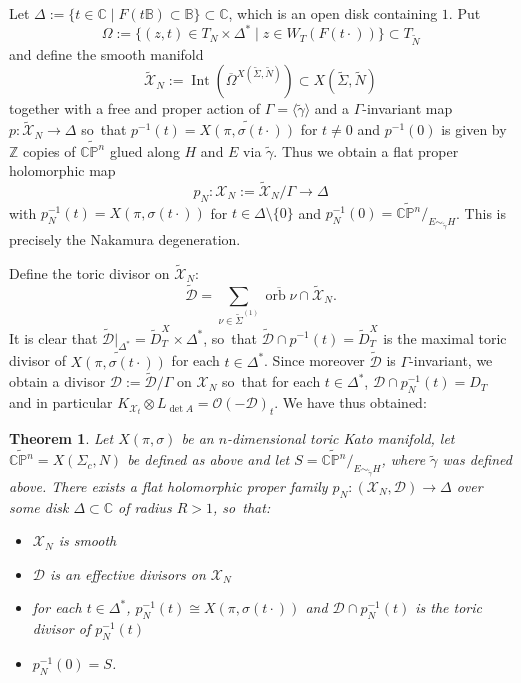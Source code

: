 \documentclass[JEP,XML,SOM,Unicode,NoFloatCountersInSection]{cedram}
\let\mathcal\mathscr
\newtheorem{theorem}{Theorem}[section]
\theoremstyle{definition}
\let\wt\widetilde
\let\ov\overline
\let\sminus\setminus
\newcommand{\BB}{\mathbb{B}}
\newcommand{\CC}{\mathbb{C}}
\newcommand{\PP}{\mathbb{P}}
\newcommand{\ZZ}{\mathbb{Z}}
\DeclareMathOperator{\Int}{Int}
\DeclareMathOperator{\orb}{orb}
\begin{document}
Let $\Delta:=\{t\in\CC\mid F(t\BB)\subset\BB\}\subset\CC$, which is an open disk containing $1$. Put
\begin{equation*}
\Omega:=\{(z,t)\in T_N\times\Delta^*\mid z\in W_T(F(t\cdot))\}\subset T_{\wt{N}}
\end{equation*}
and define the smooth manifold
\begin{equation*}
\wt{\mathcal{X}}_N:=\Int(\ov{\Omega}{}^{X(\wt{\Sigma},\wt{N})})\subset X(\wt{\Sigma},\wt{N})
\end{equation*}
together with a free and proper action of $\Gamma=\langle\wt{\gamma}\rangle$ and a $\Gamma$-invariant map $p:\wt{\mathcal{X}}_N\to\Delta$ so~that $p^{-1}(t)=\widetilde{X(\pi,\sigma(t\cdot))}$ for $t\neq 0$ and $p^{-1}(0)$ is given by $\ZZ$ copies of $\widetilde{\CC\PP^n}$ glued along $H$ and $E$ via $\wt{\gamma}$. Thus we obtain a flat proper holomorphic map
\begin{equation*}
p_{N}:\mathcal{X}_N:=\wt{\mathcal{X}}_N/\Gamma\to \Delta
\end{equation*}
with $p_{N}^{-1}(t)=X(\pi,\sigma(t\cdot))$ for $t\in\Delta\sminus \{0\}$ and $p^{-1}_{N}(0)=\widetilde{\CC\PP^n}/_{E\sim_{\wt{\gamma}} H}$. This is precisely the Nakamura degeneration.

Define the toric divisor on $\wt{\mathcal{X}}_N$:
\begin{equation*}
\wt{\mathcal D}=\sum_{\nu\in\wt{\Sigma}^{(1)}}\ov{\orb\nu}\cap\wt{\mathcal X}_N.
\end{equation*}
It is clear that $\wt{\mathcal D}|_{\Delta^*}=\wt{D}^X_T\times\Delta^*$, so~that $\wt{\mathcal{D}}\cap p^{-1}(t)=\wt{D}^X_T$ is the maximal toric divisor of $\widetilde {X(\pi,\sigma(t\cdot))}$ for each $t\in\Delta^*$. Since moreover $\wt{\mathcal D}$ is $\Gamma$-invariant, we obtain a divisor $\mathcal D:=\wt{\mathcal D}/\Gamma$ on $\mathcal X_N$ so~that for each $t\in\Delta^*$, $\mathcal D\cap p_N^{-1}(t)=D_T$ and in particular $K_{\mathcal X_t}\otimes L_{\det A}=\mathcal O(-\mathcal D)_t$. We have thus obtained:

\begin{theorem}\label{Nakadeg}
Let $X(\pi,\sigma)$ be an $n$-dimensional toric Kato manifold, let $\widetilde{\CC\PP^n}=X(\Sigma_c,N)$ be defined as above and let $S=\widetilde{\CC\PP^n}/_{E\sim_{\wt{\gamma}} H}$, where $\wt{\gamma}$ was defined above. There exists a flat holomorphic proper family $p_N:(\mathcal{X}_N,\mathcal D)\to\Delta$ over some disk $\Delta\subset\CC$ of radius $R>1$, so~that:
\begin{itemize}
\item $\mathcal X_N$ is smooth
\item $\mathcal D$ is an effective divisors on $\mathcal X_N$
\item for each $t\in\Delta^*$, $p_N^{-1}(t)\cong X(\pi,\sigma(t\cdot))$ and $\mathcal{D}\cap p_N^{-1}(t)$ is the toric divisor of $p_N^{-1}(t)$
\item $p_N^{-1}(0)=S$.
\end{itemize}
\end{theorem}
\end{document}
